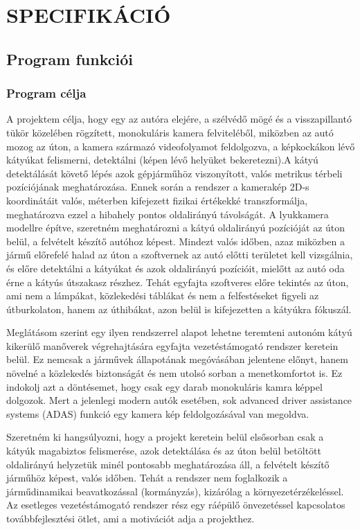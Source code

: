 \section{SPECIFIKÁCIÓ}\label{specifikuxe1ciuxf3}

\subsection{Program funkciói}\label{program-funkciuxf3i}
\subsubsection{\texorpdfstring{ Program célja}{ Program célja}}\label{program-cuxe9lja}

A projektem célja, hogy egy az autóra elejére, a szélvédő mögé és a
visszapillantó tükör közelében rögzített, monokuláris kamera
felviteléből, miközben az autó mozog az úton, a kamera származó
videofolyamot feldolgozva, a képkockákon lévő kátyúkat felismerni,
detektálni (képen lévő helyüket bekeretezni).A kátyú detektálását követő lépés azok gépjárműhöz viszonyított, valós metrikus térbeli pozíciójának meghatározása. Ennek során a rendszer a kamerakép 2D-s koordinátáit valós, méterben kifejezett fizikai értékekké transzformálja, meghatározva ezzel a hibahely pontos oldalirányú távolságát. A lyukkamera modellre
építve, szeretném meghatározni a kátyú oldalirányú pozícióját az úton
belül, a felvételt készítő autóhoz képest. Mindezt valós időben, azaz
miközben a jármű előrefelé halad az úton a szoftvernek az autó előtti
területet kell vizsgálnia, és előre detektálni a kátyúkat és azok
oldalirányú pozícióit, mielőtt az autó oda érne a kátyús útszakasz
részhez. Tehát egyfajta szoftveres előre tekintés az úton, ami nem a
lámpákat, közlekedési táblákat és nem a felfestéseket figyeli az
útburkolaton, hanem az úthibákat, azon belül is kifejezetten a kátyúkra
fókuszál.

Meglátásom szerint egy ilyen rendszerrel alapot lehetne teremteni
autonóm kátyú kikerülő manőverek végrehajtására egyfajta vezetéstámogató
rendszer keretein belül. Ez nemcsak a járművek állapotának megóvásában
jelentene előnyt, hanem növelné a közlekedés biztonságát és nem utolsó
sorban a menetkomfortot is. Ez indokolj azt a döntésemet, hogy csak egy
darab monokuláris kamra képpel dolgozok. Mert a jelenlegi modern autók
esetében, sok advanced driver assistance systems (ADAS) funkció egy
kamera kép feldolgozásával van megoldva.

Szeretném ki hangsúlyozni, hogy a projekt keretein belül elsősorban csak
a kátyúk magabiztos felismerése, azok detektálása és az úton belül
betöltött oldalirányú helyzetük minél pontosabb meghatározása áll, a
felvételt készítő járműhöz képest, valós időben. Tehát a rendszer nem
foglalkozik a járműdinamikai beavatkozással (kormányzás), kizárólag a
környezetérzékeléssel. Az esetleges vezetéstámogató rendszer rész egy
ráépülő önvezetéssel kapcsolatos továbbfejlesztési ötlet, ami a
motivációt adja a projekthez.

